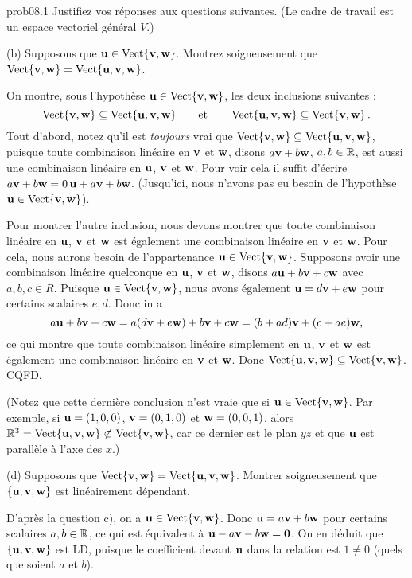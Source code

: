 \begin{sol}{prob08.1} Justifiez vos réponses aux questions suivantes. (Le cadre de travail est un espace vectoriel général $V$.)\medskip

(b) Supposons que $\uu \in \sp{\vv,\ww}$. Montrez soigneusement que $\sp{\vv,\ww}=\sp{\uu,\vv,\ww}$.

\soln On montre, sous l'hypothèse $\uu \in \sp{\vv,\ww}$, les deux inclusions suivantes : 
$$\sp{\vv,\ww}\subseteq\sp{\uu,\vv,\ww} \quad\quad\text{et}\quad\quad\sp{\uu, \vv,\ww}\subseteq\sp{\vv,\ww}\,.$$
Tout d'abord, notez qu'il est {\it toujours} vrai que $\sp{\vv,\ww}\subseteq\sp{\uu,\vv,\ww}$, puisque toute combinaison linéaire en $\vv$ et $\ww$, disons $a \vv +b \ww$, $a,b\in \R$, est aussi une combinaison linéaire en $\uu$, $\vv$ et $\ww$. Pour voir cela il suffit d'\'ecrire $a \vv +b \ww = 0\, \uu +a \vv + b \ww$. (Jusqu'ici, nous n'avons pas eu besoin de l'hypothèse $\uu \in \sp{\vv,\ww}$).

Pour montrer l'autre inclusion, nous devons montrer que toute combinaison linéaire en $\uu$, $\vv$ et $\ww$ est également une combinaison linéaire en $\vv$ et $\ww$. Pour cela, nous aurons besoin de l'appartenance $\uu \in \sp{\vv,\ww}$. Supposons avoir une combinaison linéaire quelconque en $\uu$, $\vv$ et $\ww$, disons $a\uu +b\vv +c \ww$ avec $a,b,c \in R$. Puisque $\uu \in \sp{\vv,\ww}$, nous avons également $\uu= d \vv + e \ww$ pour certains scalaires $e, d$. Donc in a  $$a\uu +b\vv +c \ww= a(d \vv + e \ww) + b\vv + c\ww=(b+ad)\vv +(c+ae) \ww,$$ ce qui montre que toute combinaison linéaire simplement en $\uu$, $\vv$ et $\ww$ est également une combinaison linéaire en $\vv$ et $\ww$. Donc $\sp{\uu,\vv,\ww} \subseteq \sp{\vv,\ww}$. CQFD.

(Notez que cette derni\`ere conclusion n'est vraie que si $\uu \in \sp{\vv,\ww}$. Par exemple, si $\uu=(1,0,0)$, $\vv=(0,1,0)$ et $\ww=(0,0,1)$, alors $\R^3=\sp{\uu,\vv,\ww}\not\subset \sp{\vv,\ww}$, car ce dernier est le plan $yz$ et que $\uu$ est parallèle à l'axe des $x$.)
\medskip
 

(d) Supposons que $\sp{\vv,\ww}=\sp{\uu,\vv,\ww}$. Montrer soigneusement que $\set{\uu,\vv,\ww}$ est linéairement dépendant. 

\soln D'apr\`es la question c), on a $\uu \in \sp{\vv,\ww}$. Donc $\uu= a \vv + b \ww$ pour certains scalaires $a, b\in\R$, ce qui est \'equivalent \`a $\uu-a\vv -b\ww=\zero$. On en déduit  que $\set{\uu,\vv,\ww}$ est LD, puisque le coefficient devant $\uu$ dans la relation est $1\not=0$ (quels que soient $a$ et $b$).
\medskip
 


\end{sol}
